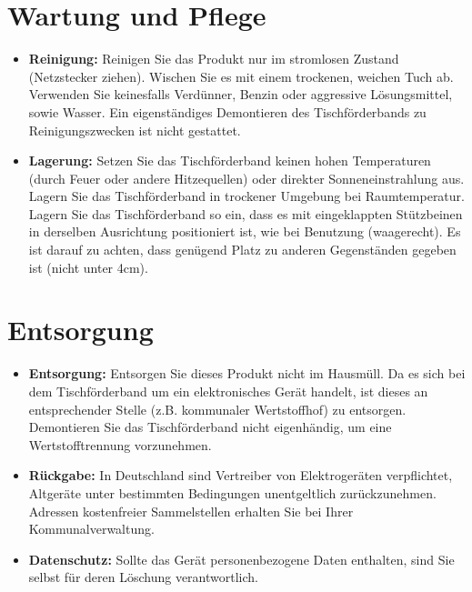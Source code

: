 \section{Wartung und Pflege}
\begin{itemize}
	\item \textbf {Reinigung:}
	Reinigen Sie das Produkt nur im stromlosen Zustand (Netzstecker ziehen). Wischen Sie es mit einem trockenen, weichen Tuch ab. Verwenden Sie keinesfalls Verdünner, Benzin oder aggressive Lösungsmittel, sowie Wasser. Ein eigenständiges Demontieren des Tischförderbands zu Reinigungszwecken ist nicht gestattet.
	
	\bigskip
	\bigskip
	\bigskip
	\bigskip
	\bigskip
	\bigskip
	\bigskip
	
	\item \textbf {Lagerung:}
	Setzen Sie das Tischförderband keinen hohen Temperaturen (durch Feuer oder andere Hitzequellen) oder direkter Sonneneinstrahlung aus. Lagern Sie das Tischförderband in trockener Umgebung bei Raumtemperatur. Lagern Sie das Tischförderband so ein, dass es mit eingeklappten Stützbeinen in derselben Ausrichtung positioniert ist, wie bei Benutzung (waagerecht). Es ist darauf zu achten, dass genügend Platz zu anderen Gegenständen gegeben ist (nicht unter 4cm). 

\end{itemize}

\section{Entsorgung}
\begin{itemize}
	\item \textbf {Entsorgung:} 
	Entsorgen Sie dieses Produkt nicht im Hausmüll. Da es sich bei dem Tischförderband um ein elektronisches Gerät handelt, ist dieses an entsprechender Stelle (z.B. kommunaler Wertstoffhof) zu entsorgen. Demontieren Sie das Tischförderband nicht eigenhändig, um eine Wertstofftrennung vorzunehmen.
	\item \textbf {Rückgabe:}
	In Deutschland sind Vertreiber von Elektrogeräten verpflichtet, Altgeräte unter bestimmten Bedingungen unentgeltlich zurückzunehmen. Adressen kostenfreier Sammelstellen erhalten Sie bei Ihrer Kommunalverwaltung.
	\item \textbf {Datenschutz:}
	Sollte das Gerät personenbezogene Daten enthalten, sind Sie selbst für deren Löschung verantwortlich.
\end{itemize}